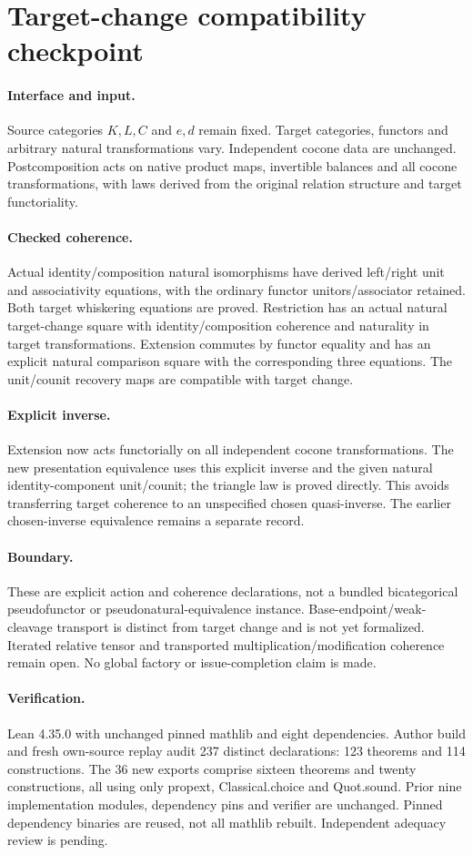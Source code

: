 \documentclass{article}
\begin{document}
\section*{Target-change compatibility checkpoint}
\paragraph{Interface and input.} Source categories $K,L,C$ and $e,d$ remain fixed. Target categories, functors and arbitrary natural transformations vary. Independent cocone data are unchanged. Postcomposition acts on native product maps, invertible balances and all cocone transformations, with laws derived from the original relation structure and target functoriality.
\paragraph{Checked coherence.} Actual identity/composition natural isomorphisms have derived left/right unit and associativity equations, with the ordinary functor unitors/associator retained. Both target whiskering equations are proved. Restriction has an actual natural target-change square with identity/composition coherence and naturality in target transformations. Extension commutes by functor equality and has an explicit natural comparison square with the corresponding three equations. The unit/counit recovery maps are compatible with target change.
\paragraph{Explicit inverse.} Extension now acts functorially on all independent cocone transformations. The new presentation equivalence uses this explicit inverse and the given natural identity-component unit/counit; the triangle law is proved directly. This avoids transferring target coherence to an unspecified chosen quasi-inverse. The earlier chosen-inverse equivalence remains a separate record.
\paragraph{Boundary.} These are explicit action and coherence declarations, not a bundled bicategorical pseudofunctor or pseudonatural-equivalence instance. Base-endpoint/weak-cleavage transport is distinct from target change and is not yet formalized. Iterated relative tensor and transported multiplication/modification coherence remain open. No global factory or issue-completion claim is made.
\paragraph{Verification.} Lean 4.35.0 with unchanged pinned mathlib and eight dependencies. Author build and fresh own-source replay audit 237 distinct declarations: 123 theorems and 114 constructions. The 36 new exports comprise sixteen theorems and twenty constructions, all using only propext, Classical.choice and Quot.sound. Prior nine implementation modules, dependency pins and verifier are unchanged. Pinned dependency binaries are reused, not all mathlib rebuilt. Independent adequacy review is pending.
\end{document}
